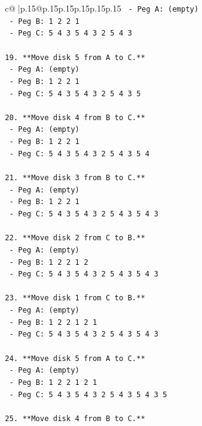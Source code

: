 \documentclass{article}
\begin{document}
{\begin{supertabular}{c@{$\;$}|p{.15\linewidth}@{}p{.15\linewidth}p{.15\linewidth}p{.15\linewidth}p{.15\linewidth}p{.15\linewidth}}
{{{\texttt{    {-} Peg A: (empty)} \\
\texttt{    {-} Peg B: 1 2 2 1} \\
\texttt{    {-} Peg C: 5 4 3 5 4 3 2 5 4 3} \\
\\ 
\texttt{19. **Move disk 5 from A to C.**} \\
\texttt{    {-} Peg A: (empty)} \\
\texttt{    {-} Peg B: 1 2 2 1} \\
\texttt{    {-} Peg C: 5 4 3 5 4 3 2 5 4 3 5} \\
\\ 
\texttt{20. **Move disk 4 from B to C.**} \\
\texttt{    {-} Peg A: (empty)} \\
\texttt{    {-} Peg B: 1 2 2 1} \\
\texttt{    {-} Peg C: 5 4 3 5 4 3 2 5 4 3 5 4} \\
\\ 
\texttt{21. **Move disk 3 from B to C.**} \\
\texttt{    {-} Peg A: (empty)} \\
\texttt{    {-} Peg B: 1 2 2 1} \\
\texttt{    {-} Peg C: 5 4 3 5 4 3 2 5 4 3 5 4 3} \\
\\ 
\texttt{22. **Move disk 2 from C to B.**} \\
\texttt{    {-} Peg A: (empty)} \\
\texttt{    {-} Peg B: 1 2 2 1 2} \\
\texttt{    {-} Peg C: 5 4 3 5 4 3 2 5 4 3 5 4 3} \\
\\ 
\texttt{23. **Move disk 1 from C to B.**} \\
\texttt{    {-} Peg A: (empty)} \\
\texttt{    {-} Peg B: 1 2 2 1 2 1} \\
\texttt{    {-} Peg C: 5 4 3 5 4 3 2 5 4 3 5 4 3} \\
\\ 
\texttt{24. **Move disk 5 from A to C.**} \\
\texttt{    {-} Peg A: (empty)} \\
\texttt{    {-} Peg B: 1 2 2 1 2 1} \\
\texttt{    {-} Peg C: 5 4 3 5 4 3 2 5 4 3 5 4 3 5} \\
\\ 
\texttt{25. **Move disk 4 from B to C.**} \\
}}}
\end{supertabular}}
\end{document}
